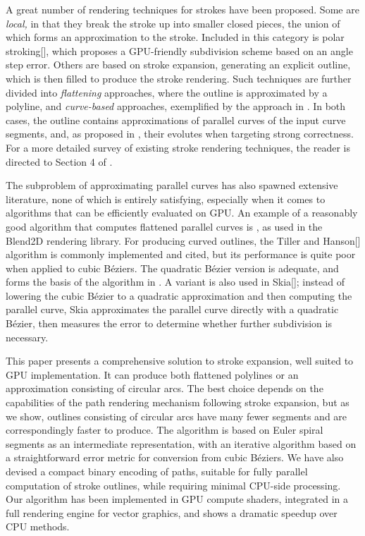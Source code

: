 \documentclass[sigconf, authordraft]{acmart}
\begin{document}
A great number of rendering techniques for strokes have been proposed. Some are \emph{local,} in that they break the stroke up into smaller closed pieces, the union of which forms an approximation to the stroke. Included in this category is polar stroking[], which proposes a GPU-friendly subdivision scheme based on an angle step error. Others are based on stroke expansion, generating an explicit outline, which is then filled to produce the stroke rendering. Such techniques are further divided into \emph{flattening} approaches, where the outline is approximated by a polyline, and \emph{curve-based} approaches, exemplified by the approach in \citet{Nehab2020}. In both cases, the outline contains approximations of parallel curves of the input curve segments, and, as proposed in \citet{Nehab2020}, their evolutes when targeting strong correctness. For a more detailed survey of existing stroke rendering techniques, the reader is directed to Section 4 of \citet{Nehab2020}.

The subproblem of approximating parallel curves has also spawned extensive literature, none of which is entirely satisfying, especially when it comes to algorithms that can be efficiently evaluated on GPU. An example of a reasonably good algorithm that computes flattened parallel curves is \citet{Yzerman2020}, as used in the Blend2D rendering library. For producing curved outlines, the Tiller and Hanson[] algorithm is commonly implemented and cited, but its performance is quite poor when applied to cubic Béziers. The quadratic Bézier version is adequate, and forms the basis of the algorithm in \citet{Nehab2020}. A variant is also used in Skia[]; instead of lowering the cubic Bézier to a quadratic approximation and then computing the parallel curve, Skia approximates the parallel curve directly with a quadratic Bézier, then measures the error to determine whether further subdivision is necessary.

This paper presents a comprehensive solution to stroke expansion, well suited to GPU implementation. It can produce both flattened polylines or an approximation consisting of circular arcs. The best choice depends on the capabilities of the path rendering mechanism following stroke expansion, but as we show, outlines consisting of circular arcs have many fewer segments and are correspondingly faster to produce. The algorithm is based on Euler spiral segments as an intermediate representation, with an iterative algorithm based on a straightforward error metric for conversion from cubic Béziers. We have also devised a compact binary encoding of paths, suitable for fully parallel computation of stroke outlines, while requiring minimal CPU-side processing. Our algorithm has been implemented in GPU compute shaders, integrated in a full rendering engine for vector graphics, and shows a dramatic speedup over CPU methods.
\end{document}

